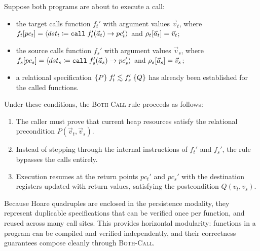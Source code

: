 \documentclass[report.tex]{subfiles}
\begin{document}
Suppose both programs are about to execute a call:
\begin{itemize}
  \item the target calls function $f_t'$ with argument values $\vec{v}_t$,
        where $\pcatis{f_t}{pc_t}{\Icall{dst_t}{f_t'}{\vec{a}_t}{pc_t'}}$
        and $\getreg{\vec{a}_t}{\rho_t} = \vec{v}_t$;
  \item the source calls function $f_s'$ with argument values $\vec{v}_s$,
        where $\pcatis{f_s}{pc_s}{\Icall{dst_s}{f_s'}{\vec{a}_s}{pc_s'}}$
        and $\getreg{\vec{a}_s}{\rho_s} = \vec{v}_s$;
  \item a relational specification $\hoareq{P}{f_t'}{f_s'}{Q}$
        has already been established for the called functions.
\end{itemize}

Under these conditions,
the \textsc{Both-Call} rule proceeds as follows:
\begin{enumerate}
  \item The caller must prove that current heap resources satisfy
        the relational precondition $P(\vec{v}_t, \vec{v}_s)$.
  \item Instead of stepping through the internal instructions of $f_t'$
        and $f_s'$,
        the rule bypasses the calls entirely.
  \item Execution resumes at the return points $pc_t'$ and $pc_s'$
        with the destination registers updated with return values,
        satisfying the postcondition $Q(v_t, v_s)$.
\end{enumerate}

Because Hoare quadruples are enclosed in the persistence modality,
they represent duplicable specifications
that can be verified once per function,
and reused across many call sites.
This provides horizontal modularity:
functions in a program can be compiled and verified independently,
and their correctness guarantees compose cleanly through \textsc{Both-Call}.
\end{document}
